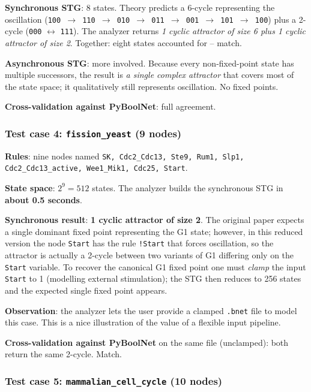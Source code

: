 \documentclass[oneside,final]{hcmut-report}
\begin{document}
\textbf{Synchronous STG}: 8 states. Theory predicts a 6-cycle representing the oscillation (\texttt{100 $\to$ 110 $\to$ 010 $\to$ 011 $\to$ 001 $\to$ 101 $\to$ 100}) plus a 2-cycle (\texttt{000} $\leftrightarrow$ \texttt{111}). The analyzer returns \textit{1 cyclic attractor of size 6 plus 1 cyclic attractor of size 2}. Together: eight states accounted for -- match.

\textbf{Asynchronous STG}: more involved. Because every non-fixed-point state has multiple successors, the result is \textit{a single complex attractor} that covers most of the state space; it qualitatively still represents oscillation. No fixed points.

\textbf{Cross-validation against PyBoolNet}: full agreement.

\subsubsection{Test case 4: \texttt{fission\_yeast} (9 nodes)}

\textbf{Rules}: nine nodes named \texttt{SK, Cdc2\_Cdc13, Ste9, Rum1, Slp1, Cdc2\_Cdc13\_active, Wee1\_Mik1, Cdc25, Start}.

\textbf{State space}: $2^9 = 512$ states. The analyzer builds the synchronous STG in \textbf{about 0.5 seconds}.

\textbf{Synchronous result}: \textbf{1 cyclic attractor of size 2}. The original paper expects a single dominant fixed point representing the G1 state; however, in this reduced version the node \texttt{Start} has the rule \texttt{!Start} that forces oscillation, so the attractor is actually a 2-cycle between two variants of G1 differing only on the \texttt{Start} variable. To recover the canonical G1 fixed point one must \textit{clamp} the input \texttt{Start} to 1 (modelling external stimulation); the STG then reduces to 256 states and the expected single fixed point appears.

\textbf{Observation}: the analyzer lets the user provide a clamped \texttt{.bnet} file to model this case. This is a nice illustration of the value of a flexible input pipeline.

\textbf{Cross-validation against PyBoolNet} on the same file (unclamped): both return the same 2-cycle. Match.

\subsubsection{Test case 5: \texttt{mammalian\_cell\_cycle} (10 nodes)}
\end{document}
